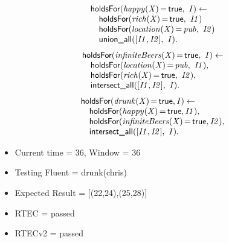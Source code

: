 \documentclass[8pt]{beamer}
\DeclareMathOperator{\val}{=}  %
\def \patsize {}
\def\holdsFor{\textsf{\patsize holdsFor}}
\def\unionall{\textsf{\patsize union\_all}}
\def\intersectall{\textsf{\patsize intersect\_all}}
\def\true{\textsf{\patsize true}}
\newenvironment{mysplit}%
  {\arraycolsep 0pt \begin{array}{l}}%
  {\end{array}}
\begin{document}
\begin{frame}
\begin{minipage}{0.48\linewidth}
        \begin{align*}
            \begin{mysplit}
                \holdsFor\mathit{(happy(X)\val\true,\ I) \leftarrow}\\
                \quad    \holdsFor\mathit{(rich(X)\val\true,\ I1)}\\
                \quad    \holdsFor\mathit{(location(X)\val pub,\ I2)}\\
                \quad    \unionall\mathit{([I1,I2],\ I)}.
            \end{mysplit}
        \end{align*}
        \begin{align*}
            \begin{mysplit}
                \holdsFor\mathit{(infiniteBeers(X)\val\true,\ I) \leftarrow}\\
                \quad    \holdsFor\mathit{(location(X)\val pub,\ I1),}\\
                \quad    \holdsFor\mathit{(rich(X)\val\true,\ I2),}\\
                \quad    \intersectall\mathit{([I1,I2],\ I).}\\
            \end{mysplit}
        \end{align*}
        \begin{align*}
            \begin{mysplit}
                \holdsFor\mathit{(drunk(X)\val\true,I) \leftarrow}\\
                \quad    \holdsFor\mathit{(happy(X)\val\true,I1),}\\
                \quad    \holdsFor\mathit{(infiniteBeers(X)\val\true,I2),}\\
                \quad    \intersectall\mathit{([I1,I2],\ I).}\\
            \end{mysplit}
        \end{align*}
    \end{minipage}

    \begin{itemize}
        \item Current time = 36, Window = 36
        \item Testing Fluent = drunk(chris)
        \item Expected Result = [(22,24),(25,28)]
        \item RTEC = passed
        \item RTECv2 = passed
    \end{itemize}
\end{frame}
\end{document}
